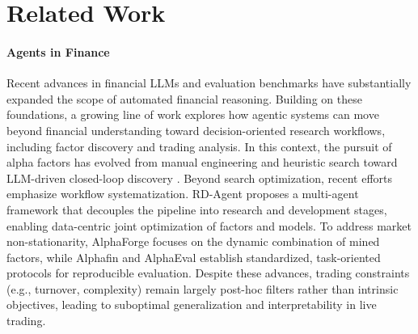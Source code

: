 \section{Related Work}

\paragraph{Agents in Finance} 
Recent advances in financial LLMs \citep{liu2023fingpt, liu2025fin} and evaluation benchmarks \citep{guo2025fineval, tang2025finmmr} have substantially expanded the scope of automated financial reasoning.
Building on these foundations, a growing line of work explores how agentic systems \citep{li2025investorbench, yang2026finvault} can move beyond financial understanding toward {decision-oriented research workflows}, including factor discovery and trading analysis.
In this context, the pursuit of alpha factors has evolved from manual engineering and heuristic search toward LLM-driven closed-loop discovery \cite{li2024can,shi2025navigating, chen2025alphasage, wang2025alpha}.
Beyond search optimization, recent efforts emphasize workflow systematization. RD-Agent \cite{li2025rdagent} proposes a multi-agent framework that decouples the pipeline into research and development stages, enabling data-centric joint optimization of factors and models. To address market non-stationarity, AlphaForge \cite{shi2024alphaforge} focuses on the dynamic combination of mined factors, 
while Alphafin \cite{li2024alphafin} and AlphaEval \cite{ding2025alphaeval} establish standardized, task-oriented protocols for reproducible evaluation. Despite these advances, trading constraints (e.g., turnover, complexity) remain largely post-hoc filters rather than intrinsic objectives, leading to suboptimal generalization and interpretability in live trading.
